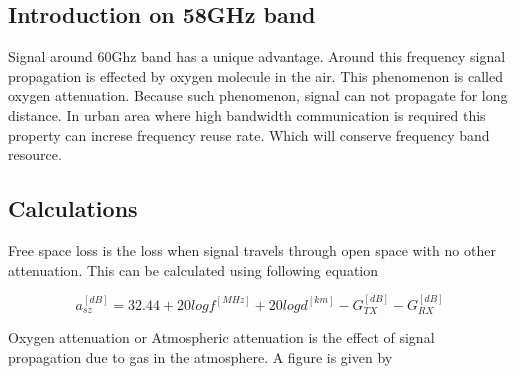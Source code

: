 \documentclass[
11pt, %
a4paper, %
oneside, %
headinclude,footinclude, %
BCOR5mm, %
]{scrartcl}
\begin{document}
\subsection{Introduction on 58GHz band}
Signal around 60Ghz band has a unique advantage. Around this frequency
signal propagation is effected by oxygen molecule in the air. This phenomenon is 
called oxygen attenuation. Because such phenomenon, signal can not propagate for long distance.
In urban area where high bandwidth communication is required this property can increse
frequency reuse rate. Which will conserve frequency band resource.

\subsection{Calculations}
Free space loss is the loss when signal travels through open space with no
other attenuation. This can be calculated using following equation \cite{openspace}

\begin{equation}
    a_{sz}^{[dB]} = 32.44 + 20log f^{[MHz]}+20log d^{[km]} - G_{TX}^{[dB]} - G_{RX}^{[dB]}
    \label{eq:openspace}
\end{equation}

Oxygen attenuation or Atmospheric attenuation is the effect of signal propagation due to
gas in the atmosphere. A figure is given by 







\renewcommand{\refname}{\spacedlowsmallcaps{References}} %




\end{document}
